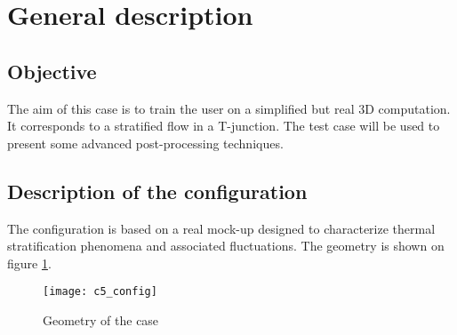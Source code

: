%
%
%
%
%
%
%
\section{General description}

        \subsection{Objective}

The aim of this case is to train the \CS user on a simplified but real 3D
computation. It corresponds to a stratified flow in a T-junction. The test case
will be used to present some advanced post-processing techniques.


        \subsection{Description of the configuration}

The configuration is based on a real mock-up designed to characterize thermal
stratification phenomena and associated fluctuations. The geometry is shown on
figure \ref{config}.


\begin{figure}[h!]
\begin{center}
\texttt{[image: c5\_config]}
\caption{Geometry of the case}
\label{config}
\end{center}
\end{figure}

